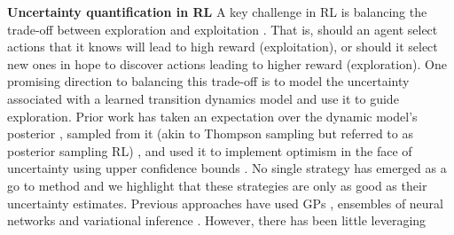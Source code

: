 \documentclass{article}
\begin{document}
\textbf{Uncertainty quantification in RL}
A key challenge in RL is balancing the trade-off between exploration and exploitation \cite{sutton2018reinforcement}.
That is, should an agent select actions that it knows will lead to high reward (exploitation), or should it
select new ones in hope to discover actions leading to higher reward (exploration).
One promising direction to balancing this trade-off is to model the uncertainty associated with a learned transition dynamics model and use it to guide exploration.
Prior work has taken an expectation over the dynamic model's posterior \cite{deisenrothPILCO2011,kamtheDataEfficient2018,chuaDeepReinforcementLearning2018},
sampled from it (akin to Thompson sampling but referred to as posterior sampling RL)
\cite{osbandMoreEfficientReinforcement2013},
and used it to implement optimism in the face of uncertainty using upper confidence bounds \cite{curiEfficient2020}.
No single strategy has emerged as a go to method and we highlight that these strategies are only as good as their uncertainty estimates.
Previous approaches have used GPs \cite{deisenrothPILCO2011,kamtheDataEfficient2018},
ensembles of neural networks \cite{curiEfficient2020,chuaDeepReinforcementLearning2018}
and variational inference \cite{galImproving2016,houthooftVIME2017}.
However, there has been little leveraging






\end{document}
